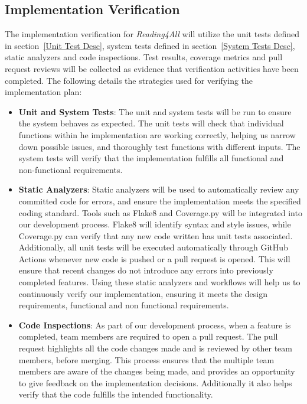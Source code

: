 \documentclass[12pt, titlepage]{article}
\begin{document}
\subsection{Implementation Verification}

The implementation verification for \textit{Reading4All} will utilize the unit tests defined in section~\ref{Unit Test Desc}, system tests defined in section~\ref{System Tests Desc},
static analyzers and code inspections. Test results, coverage metrics and pull request reviews will be collected as evidence that verification activities have been completed. 
The following details the strategies used for verifying the implementation plan: 

\begin{itemize}
  \item \textbf{Unit and System Tests}:
  The unit and system tests will be run to ensure the system behaves as expected. The unit tests will check that individual functions within he implementation are working correctly, helping us narrow down possible issues, and thoroughly test functions with different inputs. 
  The system tests will verify that the implementation fulfills all functional and non-functional requirements. \\
  
  \item \textbf{Static Analyzers}:
  Static analyzers will be used to automatically review any committed
  code for errors, and ensure the implementation meets the specified
  coding standard.
  Tools such as Flake8 and Coverage.py will be integrated into our
  development process. Flake8 will identify syntax and style issues,
  while Coverage.py can verify that any new code written has unit tests
  associated.
  Additionally, all unit tests will be executed automatically through
  GitHub Actions whenever new code is pushed or a pull request is
  opened. This will ensure that recent changes do not introduce any
  errors into previously completed features.
  Using these static analyzers and workflows will help us to
  continuously verify our implementation, ensuring it meets the design
  requirements, functional and non functional requirements.
   
  \item \textbf{Code Inspections}:
  As part of our development process, when a feature is completed, team
  members are required to open a pull request. The pull request
  highlights all the code changes made and is reviewed by other team
  members, before merging.
  This process ensures that the multiple team members are aware of the
  changes being made, and provides an opportunity to give feedback on
  the implementation decisions. Additionally it also helps verify that
  the code fulfills the intended functionality.
\end{itemize}
\end{document}
